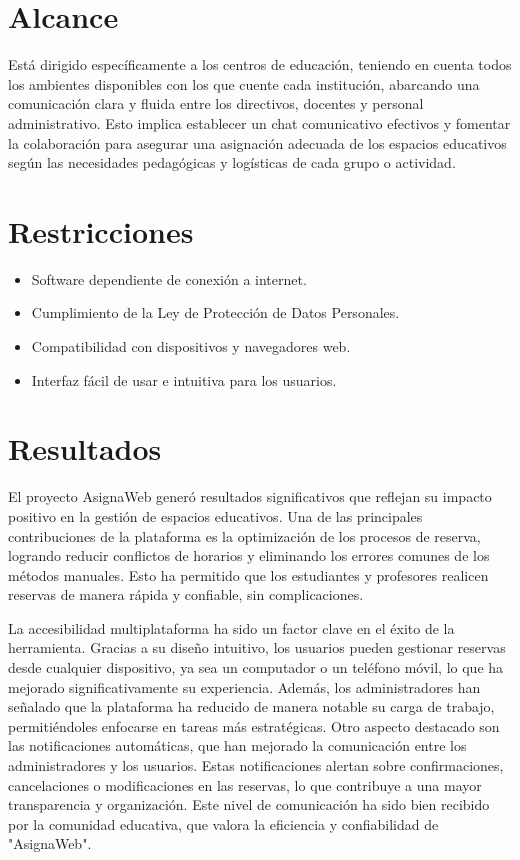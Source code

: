 \documentclass[12pt,a4paper]{article}
\begin{document}
\begin{multicols}{2}
\section*{Alcance}
Está dirigido específicamente a los centros de educación, teniendo en cuenta todos los ambientes disponibles con los que cuente cada institución, abarcando  una comunicación clara y fluida entre los directivos, docentes y personal administrativo.
Esto implica establecer un chat  comunicativo efectivos y fomentar la colaboración para asegurar una asignación adecuada de los espacios educativos según las necesidades pedagógicas y logísticas de cada grupo o actividad.


\section*{Restricciones}
\begin{itemize}
    \item Software dependiente de conexión a internet.
    \item Cumplimiento de la Ley de Protección de Datos Personales.
    \item Compatibilidad con dispositivos y navegadores web.
    \item Interfaz fácil de usar e intuitiva para los usuarios.
\end{itemize}

\section*{Resultados}
El proyecto AsignaWeb generó resultados significativos que reflejan su impacto positivo en la gestión de espacios educativos. Una de las principales contribuciones de la plataforma es la optimización de los procesos de reserva, logrando reducir conflictos de horarios y eliminando los errores comunes de los métodos manuales. Esto ha permitido que los estudiantes y profesores realicen reservas de manera rápida y confiable, sin complicaciones.

La accesibilidad multiplataforma ha sido un factor clave en el éxito de la herramienta. Gracias a su diseño intuitivo, los usuarios pueden gestionar reservas desde cualquier dispositivo, ya sea un computador o un teléfono móvil, lo que ha mejorado significativamente su experiencia. Además, los administradores han señalado que la plataforma ha reducido de manera notable su carga de trabajo, permitiéndoles enfocarse en tareas más estratégicas.
Otro aspecto destacado son las notificaciones automáticas, que han mejorado la comunicación entre los administradores y los usuarios. Estas notificaciones alertan sobre confirmaciones, cancelaciones o modificaciones en las reservas, lo que contribuye a una mayor transparencia y organización. Este nivel de comunicación ha sido bien recibido por la comunidad educativa, que valora la eficiencia y confiabilidad de "AsignaWeb".


\end{multicols}
\end{document}
